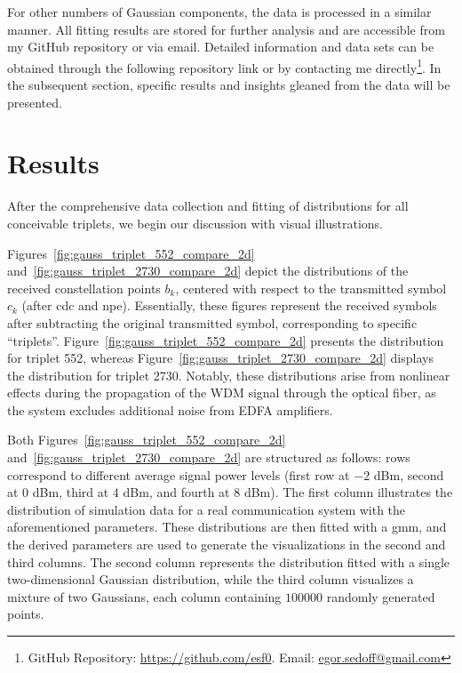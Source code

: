 For other numbers of Gaussian components, the data is processed in a similar manner. All fitting results are stored for further analysis and are accessible from my GitHub repository or via email. Detailed information and data sets can be obtained through the following repository link or by contacting me directly\footnote{GitHub Repository: \href{https://github.com/esf0}{https://github.com/esf0}. Email: \href{mailto:egor.sedoff@gmail.com}{egor.sedoff@gmail.com}}. In the subsequent section, specific results and insights gleaned from the data will be presented.


\section{Results}





After the comprehensive data collection and fitting of distributions for all conceivable triplets, we begin our discussion with visual illustrations.

Figures~\ref{fig:gauss_triplet_552_compare_2d} and~\ref{fig:gauss_triplet_2730_compare_2d} depict the distributions of the received constellation points \( b_k \), centered with respect to the transmitted symbol \( c_k \) (after \gls{cdc} and \gls{npe}). Essentially, these figures represent the received symbols after subtracting the original transmitted symbol, corresponding to specific ``triplets''. Figure~\ref{fig:gauss_triplet_552_compare_2d} presents the distribution for triplet 552, whereas Figure~\ref{fig:gauss_triplet_2730_compare_2d} displays the distribution for triplet 2730. Notably, these distributions arise from nonlinear effects during the propagation of the WDM signal through the optical fiber, as the system excludes additional noise from EDFA amplifiers.

Both Figures~\ref{fig:gauss_triplet_552_compare_2d} and~\ref{fig:gauss_triplet_2730_compare_2d} are structured as follows: rows correspond to different average signal power levels (first row at \(-2\) dBm, second at \(0\) dBm, third at \(4\) dBm, and fourth at \(8\) dBm). The first column illustrates the distribution of simulation data for a real communication system with the aforementioned parameters. These distributions are then fitted with a \gls{gmm}, and the derived parameters are used to generate the visualizations in the second and third columns. The second column represents the distribution fitted with a single two-dimensional Gaussian distribution, while the third column visualizes a mixture of two Gaussians, each column containing \(100000\) randomly generated points.

